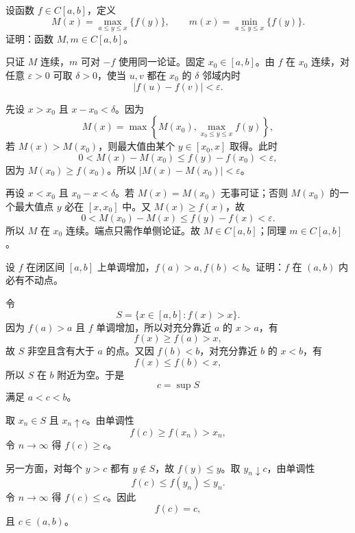 \begin{xreferenceproblem}[10]
设函数 $f\in C[a,b]$，定义
  \[
    M(x)=\max_{a\le y\le x}\{f(y)\},\qquad m(x)=\min_{a\le y\le x}\{f(y)\}.
  \]
  证明：函数 $M,m\in C[a,b]$。
\end{xreferenceproblem}
\begin{xsolution}
只证 $M$ 连续，$m$ 可对 $-f$ 使用同一论证。固定 $x_0\in[a,b]$。由 $f$ 在 $x_0$ 连续，对任意 $\varepsilon>0$ 可取 $\delta>0$，使当 $u,v$ 都在 $x_0$ 的 $\delta$ 邻域内时
\[
 |f(u)-f(v)|<\varepsilon.
\]

先设 $x>x_0$ 且 $x-x_0<\delta$。因为
\[
 M(x)=\max\left\{M(x_0),\max_{x_0\le y\le x}f(y)\right\},
\]
若 $M(x)>M(x_0)$，则最大值由某个 $y\in[x_0,x]$ 取得。此时
\[
 0<M(x)-M(x_0)
 \le f(y)-f(x_0)<\varepsilon,
\]
因为 $M(x_0)\ge f(x_0)$。所以 $|M(x)-M(x_0)|<\varepsilon$。

再设 $x<x_0$ 且 $x_0-x<\delta$。若 $M(x)=M(x_0)$ 无事可证；否则 $M(x_0)$ 的一个最大值点 $y$ 必在 $[x,x_0]$ 中。又 $M(x)\ge f(x)$，故
\[
 0<M(x_0)-M(x)
 \le f(y)-f(x)<\varepsilon.
\]
所以 $M$ 在 $x_0$ 连续。端点只需作单侧论证。故 $M\in C[a,b]$；同理 $m\in C[a,b]$。
\end{xsolution}


\begin{xreferenceproblem}[11]
设 $f$ 在闭区间 $[a,b]$ 上单调增加，$f(a)>a,f(b)<b$。证明：$f$ 在 $(a,b)$ 内必有不动点。
\end{xreferenceproblem}
\begin{xsolution}
令
\[
 S=\{x\in[a,b]:f(x)>x\}.
\]
因为 $f(a)>a$ 且 $f$ 单调增加，所以对充分靠近 $a$ 的 $x>a$，有
\[
 f(x)\ge f(a)>x,
\]
故 $S$ 非空且含有大于 $a$ 的点。又因 $f(b)<b$，对充分靠近 $b$ 的 $x<b$，有
\[
 f(x)\le f(b)<x,
\]
所以 $S$ 在 $b$ 附近为空。于是
\[
 c=\sup S
\]
满足 $a<c<b$。

取 $x_n\in S$ 且 $x_n\uparrow c$。由单调性
\[
 f(c)\ge f(x_n)>x_n,
\]
令 $n\to\infty$ 得 $f(c)\ge c$。

另一方面，对每个 $y>c$ 都有 $y\notin S$，故 $f(y)\le y$。取 $y_n\downarrow c$，由单调性
\[
 f(c)\le f(y_n)\le y_n.
\]
令 $n\to\infty$ 得 $f(c)\le c$。因此
\[
 f(c)=c,
\]
且 $c\in(a,b)$。
\end{xsolution}


